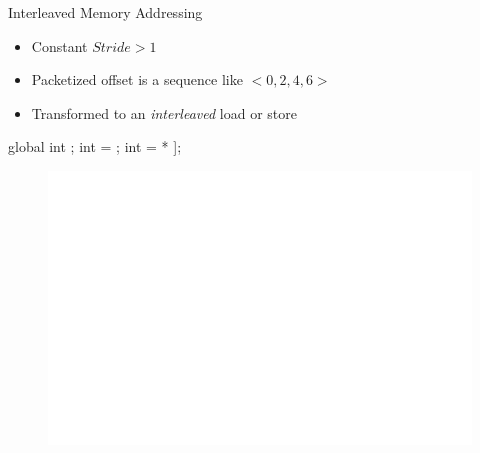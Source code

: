 \begin{frame}[fragile]{Interleaved Memory Addressing}

\begin{itemize}
    \item Constant $Stride > 1$
    \item Packetized offset is a sequence like $<0, 2, 4, 6>$
    \item Transformed to an \emph{interleaved} load or store
\end{itemize}

\begin{minipage}[t]{0.40\linewidth}
    \vspace{0.1ex}
    \begin{codebox}[commandchars=\\\[\]]
    
global int \uniform[*src];
int \varying[tid] = ;
int \varying[x] = \uniform[src]\idx[\varying[tid] * \uniform[2]];





    \end{codebox}
\end{minipage}
\hspace{1em}
\begin{minipage}[t]{0.49\linewidth}
    \begin{figure}
        \includegraphics[scale=0.5]{images/interleaved-access.pdf}
    \end{figure}
\end{minipage}

\end{frame}


